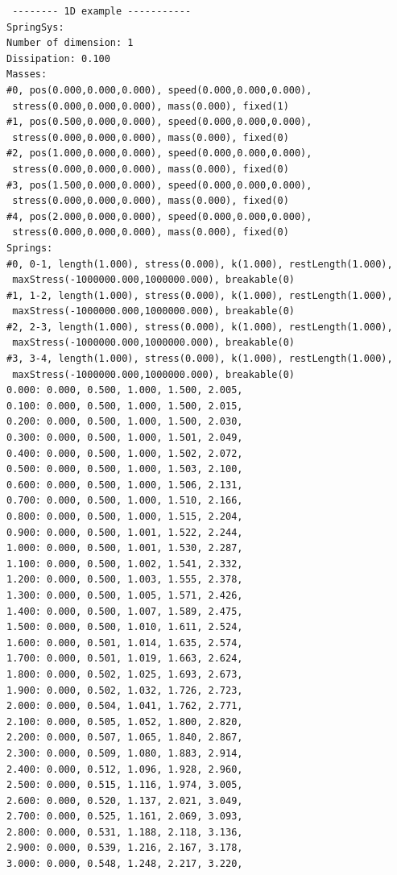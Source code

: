 \documentclass[12pt, a4paper]{article}
\begin{document}
\begin{scriptsize}
\begin{ttfamily}
\begin{lstlisting}
 -------- 1D example -----------
SpringSys:
Number of dimension: 1
Dissipation: 0.100
Masses:
#0, pos(0.000,0.000,0.000), speed(0.000,0.000,0.000),
 stress(0.000,0.000,0.000), mass(0.000), fixed(1)
#1, pos(0.500,0.000,0.000), speed(0.000,0.000,0.000),
 stress(0.000,0.000,0.000), mass(0.000), fixed(0)
#2, pos(1.000,0.000,0.000), speed(0.000,0.000,0.000),
 stress(0.000,0.000,0.000), mass(0.000), fixed(0)
#3, pos(1.500,0.000,0.000), speed(0.000,0.000,0.000),
 stress(0.000,0.000,0.000), mass(0.000), fixed(0)
#4, pos(2.000,0.000,0.000), speed(0.000,0.000,0.000),
 stress(0.000,0.000,0.000), mass(0.000), fixed(0)
Springs:
#0, 0-1, length(1.000), stress(0.000), k(1.000), restLength(1.000),
 maxStress(-1000000.000,1000000.000), breakable(0)
#1, 1-2, length(1.000), stress(0.000), k(1.000), restLength(1.000),
 maxStress(-1000000.000,1000000.000), breakable(0)
#2, 2-3, length(1.000), stress(0.000), k(1.000), restLength(1.000),
 maxStress(-1000000.000,1000000.000), breakable(0)
#3, 3-4, length(1.000), stress(0.000), k(1.000), restLength(1.000),
 maxStress(-1000000.000,1000000.000), breakable(0)
0.000: 0.000, 0.500, 1.000, 1.500, 2.005, 
0.100: 0.000, 0.500, 1.000, 1.500, 2.015, 
0.200: 0.000, 0.500, 1.000, 1.500, 2.030, 
0.300: 0.000, 0.500, 1.000, 1.501, 2.049, 
0.400: 0.000, 0.500, 1.000, 1.502, 2.072, 
0.500: 0.000, 0.500, 1.000, 1.503, 2.100, 
0.600: 0.000, 0.500, 1.000, 1.506, 2.131, 
0.700: 0.000, 0.500, 1.000, 1.510, 2.166, 
0.800: 0.000, 0.500, 1.000, 1.515, 2.204, 
0.900: 0.000, 0.500, 1.001, 1.522, 2.244, 
1.000: 0.000, 0.500, 1.001, 1.530, 2.287, 
1.100: 0.000, 0.500, 1.002, 1.541, 2.332, 
1.200: 0.000, 0.500, 1.003, 1.555, 2.378, 
1.300: 0.000, 0.500, 1.005, 1.571, 2.426, 
1.400: 0.000, 0.500, 1.007, 1.589, 2.475, 
1.500: 0.000, 0.500, 1.010, 1.611, 2.524, 
1.600: 0.000, 0.501, 1.014, 1.635, 2.574, 
1.700: 0.000, 0.501, 1.019, 1.663, 2.624, 
1.800: 0.000, 0.502, 1.025, 1.693, 2.673, 
1.900: 0.000, 0.502, 1.032, 1.726, 2.723, 
2.000: 0.000, 0.504, 1.041, 1.762, 2.771, 
2.100: 0.000, 0.505, 1.052, 1.800, 2.820, 
2.200: 0.000, 0.507, 1.065, 1.840, 2.867, 
2.300: 0.000, 0.509, 1.080, 1.883, 2.914, 
2.400: 0.000, 0.512, 1.096, 1.928, 2.960, 
2.500: 0.000, 0.515, 1.116, 1.974, 3.005, 
2.600: 0.000, 0.520, 1.137, 2.021, 3.049, 
2.700: 0.000, 0.525, 1.161, 2.069, 3.093, 
2.800: 0.000, 0.531, 1.188, 2.118, 3.136, 
2.900: 0.000, 0.539, 1.216, 2.167, 3.178, 
3.000: 0.000, 0.548, 1.248, 2.217, 3.220, 

\end{lstlisting}
\end{ttfamily}
\end{scriptsize}
\end{document}
